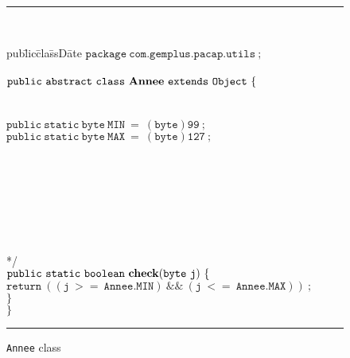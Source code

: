 \documentclass[a4paper]{llncs}
\begin{document}
\begin{center}
\begin{figure}[hbt]
\rule{\linewidth}{0.3mm}
\\[2.0ex]
\begin{tabbing}
pub\=lic\=cla\=ssD\=ate  \kill
$\mathtt{package\ com.gemplus.pacap.utils\ ;}$ \\
 \\
$\mathtt{public\ abstract\ class\ {\bf Annee}\ extends\ Object\ \{}$ \\
 \\
 \\ 
\>$\mathtt{public\ static\ byte\ MIN\ =\ (byte)99\ ;} $\\
\>$\mathtt{public\ static\ byte\ MAX\ =\ (byte)127\ ;} $\\
\\
\\
 \\
\> \\
\> \\
\> \\
\> \\
\>*/ \\
\>$\mathtt{public\ static\ boolean\ {\bf check}(byte\ j)\ \{} $ \\
\>\>$\mathtt{return\ ((j\ >=\ Annee.MIN)\ \&\&\ (j\ <=\ Annee.MAX))\ ;}$  \\
\>$\mathtt{\}} $ \\
$\mathtt{\}} $ \\
\end{tabbing}
\caption{{\tt Annee} class}
\label{fig-cla-ann}
\rule{\linewidth}{0.3mm}
\end{figure}
\end{center}
\end{document}
